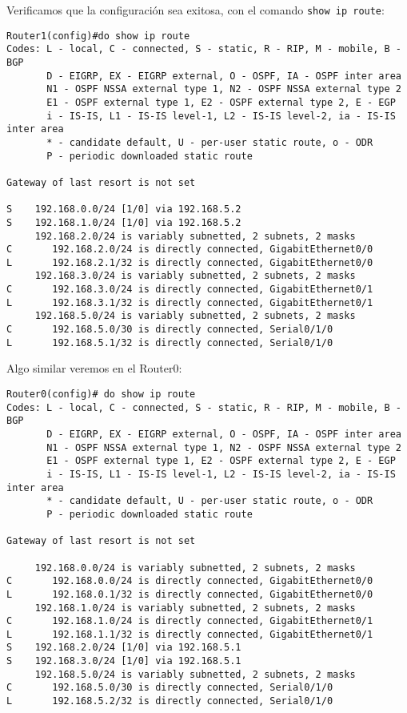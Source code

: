 \documentclass{article}
\begin{document}
Verificamos que la configuraci\'on sea exitosa, con el comando \texttt{show ip route}: \\
\begin{verbatim}
Router1(config)#do show ip route
Codes: L - local, C - connected, S - static, R - RIP, M - mobile, B - BGP
       D - EIGRP, EX - EIGRP external, O - OSPF, IA - OSPF inter area
       N1 - OSPF NSSA external type 1, N2 - OSPF NSSA external type 2
       E1 - OSPF external type 1, E2 - OSPF external type 2, E - EGP
       i - IS-IS, L1 - IS-IS level-1, L2 - IS-IS level-2, ia - IS-IS inter area
       * - candidate default, U - per-user static route, o - ODR
       P - periodic downloaded static route

Gateway of last resort is not set

S    192.168.0.0/24 [1/0] via 192.168.5.2
S    192.168.1.0/24 [1/0] via 192.168.5.2
     192.168.2.0/24 is variably subnetted, 2 subnets, 2 masks
C       192.168.2.0/24 is directly connected, GigabitEthernet0/0
L       192.168.2.1/32 is directly connected, GigabitEthernet0/0
     192.168.3.0/24 is variably subnetted, 2 subnets, 2 masks
C       192.168.3.0/24 is directly connected, GigabitEthernet0/1
L       192.168.3.1/32 is directly connected, GigabitEthernet0/1
     192.168.5.0/24 is variably subnetted, 2 subnets, 2 masks
C       192.168.5.0/30 is directly connected, Serial0/1/0
L       192.168.5.1/32 is directly connected, Serial0/1/0

\end{verbatim}
Algo similar veremos en el Router0: \\
\begin{verbatim}
Router0(config)# do show ip route
Codes: L - local, C - connected, S - static, R - RIP, M - mobile, B - BGP
       D - EIGRP, EX - EIGRP external, O - OSPF, IA - OSPF inter area
       N1 - OSPF NSSA external type 1, N2 - OSPF NSSA external type 2
       E1 - OSPF external type 1, E2 - OSPF external type 2, E - EGP
       i - IS-IS, L1 - IS-IS level-1, L2 - IS-IS level-2, ia - IS-IS inter area
       * - candidate default, U - per-user static route, o - ODR
       P - periodic downloaded static route

Gateway of last resort is not set

     192.168.0.0/24 is variably subnetted, 2 subnets, 2 masks
C       192.168.0.0/24 is directly connected, GigabitEthernet0/0
L       192.168.0.1/32 is directly connected, GigabitEthernet0/0
     192.168.1.0/24 is variably subnetted, 2 subnets, 2 masks
C       192.168.1.0/24 is directly connected, GigabitEthernet0/1
L       192.168.1.1/32 is directly connected, GigabitEthernet0/1
S    192.168.2.0/24 [1/0] via 192.168.5.1
S    192.168.3.0/24 [1/0] via 192.168.5.1
     192.168.5.0/24 is variably subnetted, 2 subnets, 2 masks
C       192.168.5.0/30 is directly connected, Serial0/1/0
L       192.168.5.2/32 is directly connected, Serial0/1/0

\end{verbatim}
\end{document}
